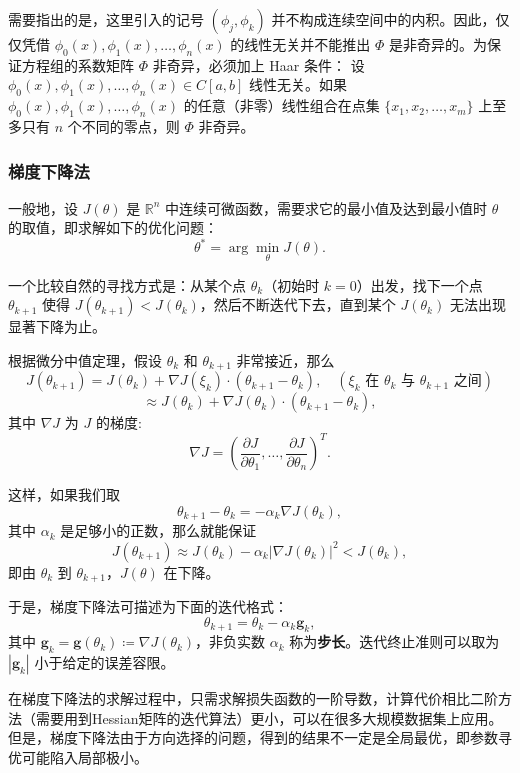 \documentclass{article}
\begin{document}
需要指出的是，这里引入的记号 \((\phi_{j},\phi_{k})\) 并不构成连续空间中的内积。因此，仅仅凭借 \(\phi_{0}(x),\phi_{1}(x),\dots ,\phi_{n}(x)\) 的线性无关并不能推出 \(\Phi\) 是非奇异的。为保证方程组的系数矩阵 \(\Phi\) 非奇异，必须加上 Haar 条件：
设 \(\phi_{0}(x),\phi_{1}(x),\dots ,\phi_{n}(x)\in C[a,b]\) 线性无关。如果 \(\phi_{0}(x),\phi_{1}(x),\dots ,\phi_{n}(x)\) 的任意（非零）线性组合在点集 \(\{x_{1},x_{2},\dots ,x_{m}\}\) 上至多只有 \(n\) 个不同的零点，则 \(\Phi\) 非奇异。

\subsubsection{梯度下降法}
一般地，设 \(J(\theta)\) 是 \(\mathbb{R}^{n}\) 中连续可微函数，需要求它的最小值及达到最小值时 \(\theta\) 的取值，即求解如下的优化问题：
\[
\theta^{*} = \arg\min_{\theta} J(\theta).
\]

一个比较自然的寻找方式是：从某个点 \(\theta_{k}\)（初始时 \(k = 0\)）出发，找下一个点 \(\theta_{k + 1}\) 使得 \(J(\theta_{k + 1}) < J(\theta_{k})\)，然后不断迭代下去，直到某个 \(J(\theta_{k})\) 无法出现显著下降为止。

根据微分中值定理，假设 \(\theta_{k}\) 和 \(\theta_{k + 1}\) 非常接近，那么
\[
J(\theta_{k + 1}) = J(\theta_{k}) + \nabla J(\xi_{k})\cdot (\theta_{k + 1} - \theta_{k}), \quad (\xi_{k} \text{ 在 } \theta_{k} \text{ 与 } \theta_{k + 1} \text{ 之间})
\]
\[
\approx J(\theta_{k}) + \nabla J(\theta_{k})\cdot (\theta_{k + 1} - \theta_{k}),
\]
其中 \(\nabla J\) 为 \(J\) 的梯度:
\[
\nabla J = \left(\frac{\partial J}{\partial\theta_{1}},\dots ,\frac{\partial J}{\partial\theta_{n}}\right)^{T}.
\]

这样，如果我们取
\[
\theta_{k + 1} - \theta_{k} = -\alpha_{k}\nabla J(\theta_{k}),
\]
其中 \(\alpha_{k}\) 是足够小的正数，那么就能保证
\[
J(\theta_{k + 1}) \approx J(\theta_{k}) - \alpha_{k}|\nabla J(\theta_{k})|^{2} < J(\theta_{k}),
\]
即由 \(\theta_{k}\) 到 \(\theta_{k + 1}\)，\(J(\theta)\) 在下降。

于是，梯度下降法可描述为下面的迭代格式：
\[
\theta_{k + 1} = \theta_{k} - \alpha_{k}\bm{g}_{k},
\]
其中 \(\bm{g}_{k} = \bm{g}(\theta_{k}) \coloneqq \nabla J(\theta_{k})\)，非负实数 \(\alpha_{k}\) 称为\textbf{步长}。迭代终止准则可以取为 \(|\bm{g}_{k}|\) 小于给定的误差容限。

在梯度下降法的求解过程中，只需求解损失函数的一阶导数，计算代价相比二阶方法（需要用到Hessian矩阵的迭代算法）更小，可以在很多大规模数据集上应用。但是，梯度下降法由于方向选择的问题，得到的结果不一定是全局最优，即参数寻优可能陷入局部极小。
\end{document}
